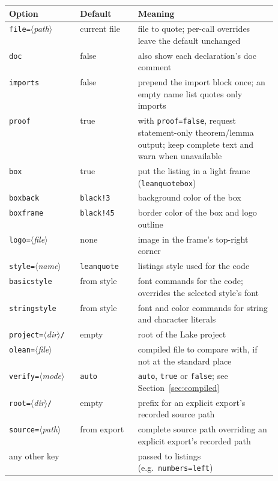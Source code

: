 \documentclass[11pt]{article}
\newcommand{\meta}[1]{\ensuremath{\langle}\textit{#1}\ensuremath{\rangle}}
\newcommand{\opt}[1]{\texttt{#1}}
\begin{document}
\begin{center}
\begin{tabular}{@{}llp{0.52\linewidth}@{}}
\toprule
Option & Default & Meaning \\
\midrule
\opt{file=}\meta{path} & current file & file to quote; per-call overrides leave the default unchanged \\
\opt{doc} & false & also show each declaration's doc comment \\
\opt{imports} & false & prepend the import block once; an empty name list quotes only imports \\
\opt{proof} & true & with \opt{proof=false}, request statement-only theorem/lemma output; keep complete text and warn when unavailable \\
\opt{box} & true & put the listing in a light frame (\texttt{leanquotebox}) \\
\opt{boxback} & \texttt{black!3} & background color of the box \\
\opt{boxframe} & \texttt{black!45} & border color of the box and logo outline \\
\opt{logo=}\meta{file} & none & image in the frame's top-right corner \\
\opt{style=}\meta{name} & \texttt{leanquote} & listings style used for the code \\
\opt{basicstyle} & from style & font commands for the code; overrides the selected style's font \\
\opt{stringstyle} & from style & font and color commands for string and character literals \\
\opt{project=}\meta{dir}\texttt{/} & empty & root of the Lake project \\
\opt{olean=}\meta{file} & & compiled file to compare with, if not at the standard place \\
\opt{verify=}\meta{mode} & \texttt{auto} & \texttt{auto}, \texttt{true} or \texttt{false}; see Section~\ref{sec:compiled} \\
\opt{root=}\meta{dir}\texttt{/} & empty & prefix for an explicit export's recorded source path \\
\opt{source=}\meta{path} & from export & complete source path overriding an explicit export's recorded path \\
any other key & & passed to \textsf{listings} (e.g.\ \opt{numbers=left}) \\
\bottomrule
\end{tabular}
\end{center}
\end{document}
